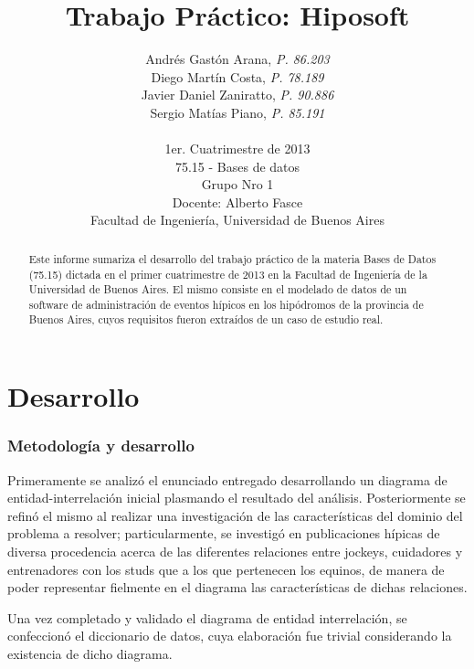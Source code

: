 \documentclass[a4paper,11pt]{article}
\title{\textbf{Trabajo Práctico: Hiposoft}}
\author{%
  Andrés Gastón Arana,     \textit{P. 86.203}                      \\
  Diego Martín Costa,      \textit{P. 78.189}                      \\
  Javier Daniel Zaniratto, \textit{P. 90.886}                      \\
  Sergio Matías Piano,     \textit{P. 85.191}                      \\
  \\
  \normalsize{1er. Cuatrimestre de 2013}                           \\
  \normalsize{75.15 - Bases de datos}                              \\
  \normalsize{Grupo Nro 1}		                           \\
  \normalsize{Docente: Alberto Fasce}	                           \\
  \normalsize{Facultad de Ingeniería, Universidad de Buenos Aires}
}
\date{}
\begin{document}
\thispagestyle{empty}
\maketitle

\begin{abstract}

  Este informe sumariza el desarrollo del trabajo práctico de la materia Bases
  de Datos (75.15) dictada en el primer cuatrimestre de 2013 en la Facultad de
  Ingeniería de la Universidad de Buenos Aires. El mismo consiste en el
  modelado de datos de un software de administración de eventos hípicos en los
  hipódromos de la provincia de Buenos Aires, cuyos requisitos fueron extraídos
  de un caso de estudio real.

\end{abstract}

\clearpage

\tableofcontents
\clearpage


\part{Desarrollo}

\section{Metodología y desarrollo}

Primeramente se analizó el enunciado entregado desarrollando un diagrama de
entidad-interrelación inicial plasmando el resultado del análisis.
Posteriormente se refinó el mismo al realizar una investigación de las
características del dominio del problema a resolver; particularmente, se
investigó en publicaciones hípicas de diversa procedencia acerca de las
diferentes relaciones entre jockeys, cuidadores y entrenadores con los studs
que a los que pertenecen los equinos, de manera de poder representar fielmente
en el diagrama las características de dichas relaciones.

Una vez completado y validado el diagrama de entidad interrelación, se
confeccionó el diccionario de datos, cuya elaboración fue trivial considerando
la existencia de dicho diagrama.
\end{document}
